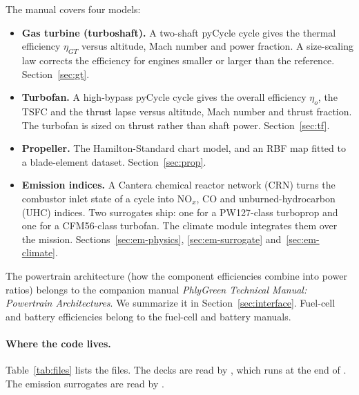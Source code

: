 \documentclass[a4paper,11pt]{article}
\newcommand{\etagt}{\eta_{GT}}
\newcommand{\etao}{\eta_{o}}
\begin{document}
The manual covers four models:
\begin{itemize}
\item \textbf{Gas turbine (turboshaft).} A two-shaft pyCycle cycle gives the thermal efficiency
  $\etagt$ versus altitude, Mach number and power fraction. A size-scaling law corrects the
  efficiency for engines smaller or larger than the reference.
  Section~\ref{sec:gt}.
\item \textbf{Turbofan.} A high-bypass pyCycle cycle gives the overall efficiency $\etao$, the
  TSFC and the thrust lapse versus altitude, Mach number and thrust fraction. The turbofan is
  sized on thrust rather than shaft power. Section~\ref{sec:tf}.
\item \textbf{Propeller.} The Hamilton-Standard chart model, and an RBF map fitted to a
  blade-element dataset. Section~\ref{sec:prop}.
\item \textbf{Emission indices.} A Cantera chemical reactor network (CRN) turns the combustor
  inlet state of a cycle into NO$_x$, CO and unburned-hydrocarbon (UHC) indices. Two
  surrogates ship: one for a PW127-class turboprop and one for a CFM56-class turbofan. The
  climate module integrates them over the mission. Sections~\ref{sec:em-physics},
  \ref{sec:em-surrogate} and~\ref{sec:em-climate}.
\end{itemize}

The powertrain architecture (how the component efficiencies combine into power ratios) belongs
to the companion manual \emph{PhlyGreen Technical Manual: Powertrain Architectures}. We
summarize it in Section~\ref{sec:interface}. Fuel-cell and battery efficiencies belong to the
fuel-cell and battery manuals.

\paragraph{Where the code lives.} Table~\ref{tab:files} lists the files. The decks are read by
, which runs at the end of . The
emission surrogates are read by .
\end{document}
